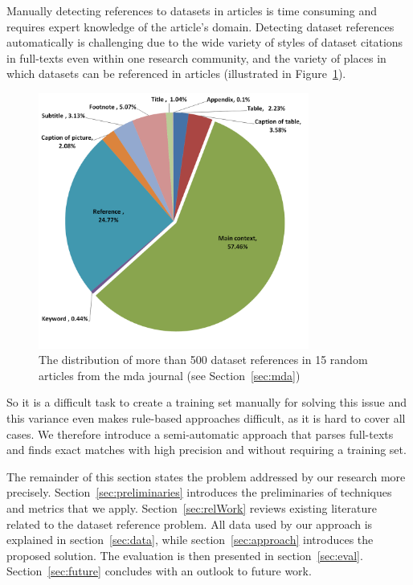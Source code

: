 \documentclass{IOS-Book-Article}
\begin{document}
Manually detecting references to datasets in articles is time consuming and requires expert knowledge of the article's domain. 
Detecting dataset references automatically is challenging 
due to the wide variety of styles of dataset citations in full-texts even within one research community, and the variety
of places in which datasets can be referenced in articles  
(illustrated in Figure~\ref{fig:places-example}).  
\begin{figure}[h]
	\centering
	\includegraphics[width=3.5in]{DistPlaces4.png}
	\caption{The distribution of more than 500 dataset references in 15 random articles from the mda journal (see Section~\ref{sec:mda})}
	\label{fig:places-example}
\end{figure}
So it is a difficult task to create a training set manually for solving this issue and this variance even makes rule-based approaches difficult, as it is hard to cover all cases.
We therefore introduce a semi-automatic approach that parses full-texts and finds exact matches with high precision and without requiring a training set. 

The remainder of this section states the problem addressed by our research more precisely.
Section~\ref{sec:preliminaries} introduces the preliminaries of techniques and metrics that we apply.
Section~\ref{sec:relWork} reviews existing literature related to the dataset reference problem.
All data used by our approach is explained in section~\ref{sec:data}, while section~\ref{sec:approach} introduces the proposed solution.
The evaluation is then presented in section~\ref{sec:eval}.
Section~\ref{sec:future} concludes with an outlook to future work. 
 
\end{document}
